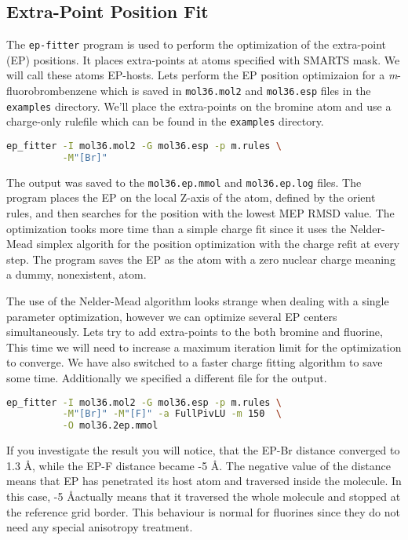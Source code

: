 \documentclass[10pt,a4paper]{article}
\begin{document}
\subsection{Extra-Point Position Fit}
The \lstinline{ep-fitter} program is used to perform the optimization of the extra-point (EP)
positions.
It places extra-points at atoms specified with SMARTS mask. We will call these atoms EP-hosts.
Lets perform the EP
position optimizaion for a \textit{m}-fluorobrombenzene which is saved in
\lstinline{mol36.mol2} and \lstinline{mol36.esp} files in the \lstinline{examples} directory.
We'll place the extra-points on the bromine atom and use a charge-only rulefile which can be 
found in the \lstinline{examples} directory.
\begin{lstlisting}[language=bash]
ep_fitter -I mol36.mol2 -G mol36.esp -p m.rules \
          -M"[Br]"
\end{lstlisting}
The output was saved to the \lstinline{mol36.ep.mmol} and \lstinline{mol36.ep.log} files. 
The program places the EP
on the local Z-axis of the atom, defined by the orient rules, and then searches for 
the position
with the lowest MEP RMSD value. The optimization tooks more time than a simple charge fit 
since it uses the Nelder-Mead simplex algorith for the position optimization with the 
charge refit at every step. The program saves the EP as the atom with a zero nuclear 
charge meaning a dummy, nonexistent, atom.

The use of the Nelder-Mead algorithm looks strange when dealing with a single parameter
optimization, however we can optimize several EP centers simultaneously. Lets try to 
add extra-points to the
both bromine and fluorine, This time we will need to increase a maximum iteration limit 
for the optimization to converge. We have also switched to a faster charge fitting 
algorithm to save some time. Additionally we specified a different file for the output.
\begin{lstlisting}[language=bash]
ep_fitter -I mol36.mol2 -G mol36.esp -p m.rules \
          -M"[Br]" -M"[F]" -a FullPivLU -m 150  \
          -O mol36.2ep.mmol
\end{lstlisting}
If you investigate the result you will notice, that the EP-Br distance converged to 1.3 \AA,
while the EP-F distance became -5 \AA. The negative value of the distance means that EP has
penetrated its host atom
and traversed inside the molecule. In this case, -5 \AA  actually means that it traversed 
the whole molecule and stopped at the reference grid border. This behaviour is normal 
for fluorines since they do not need any special anisotropy treatment.
\end{document}
